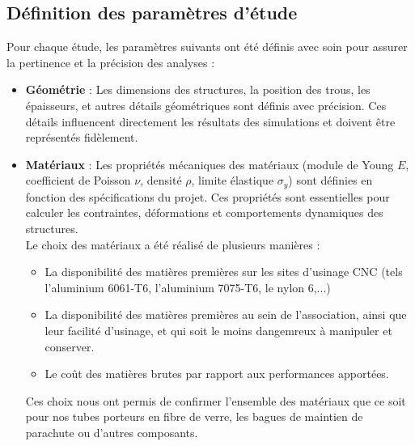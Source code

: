 \subsection{Définition des paramètres d'étude}

Pour chaque étude, les paramètres suivants ont été définis avec soin pour assurer la 
pertinence et la précision des analyses :

\begin{itemize}
    \item \textbf{Géométrie} :
    Les dimensions des structures, la position des trous, les épaisseurs, et autres
     détails géométriques sont définis avec précision. Ces détails influencent 
     directement les résultats des simulations et doivent être représentés fidèlement.

    \item \textbf{Matériaux} :
    Les propriétés mécaniques des matériaux (module de Young \(E\), coefficient de 
    Poisson \(\nu\), densité \(\rho\), limite élastique \(\sigma_y\)) sont définies en 
    fonction des spécifications du projet. Ces propriétés sont essentielles pour 
    calculer les contraintes, déformations et comportements dynamiques des structures.\\

    Le choix des matériaux a été réalisé de plusieurs manières :
    \begin{itemize}
	\item La disponibilité des matières premières sur les sites d'usinage CNC (tels l'aluminium 6061-T6, l'aluminium 7075-T6, le nylon 6,...)
	\item La disponibilité des matières premières au sein de l'association, ainsi que leur facilité d'usinage, et qui soit le moins dangemreux à manipuler et conserver.
	\item Le coût des matières brutes par rapport aux performances apportées.
    \end{itemize}
	

	Ces choix nous ont permis de confirmer l'ensemble des matériaux que ce soit pour nos tubes porteurs en fibre de verre, les
    bagues de maintien de parachute ou d'autres composants.



\end{itemize}
